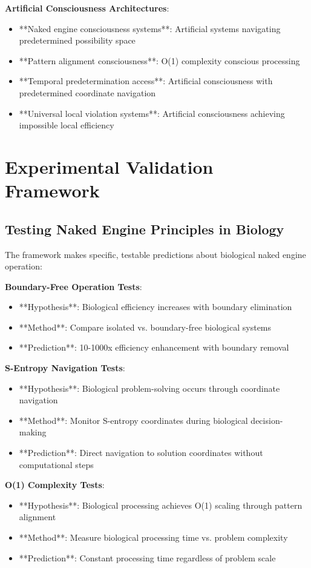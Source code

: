 \documentclass[12pt,a4paper]{article}
\begin{document}
\textbf{Artificial Consciousness Architectures}:
\begin{itemize}
\item **Naked engine consciousness systems**: Artificial systems navigating predetermined possibility space
\item **Pattern alignment consciousness**: O(1) complexity conscious processing
\item **Temporal predetermination access**: Artificial consciousness with predetermined coordinate navigation
\item **Universal local violation systems**: Artificial consciousness achieving impossible local efficiency
\end{itemize}

\section{Experimental Validation Framework}

\subsection{Testing Naked Engine Principles in Biology}

The framework makes specific, testable predictions about biological naked engine operation:

\textbf{Boundary-Free Operation Tests}:
\begin{itemize}
\item **Hypothesis**: Biological efficiency increases with boundary elimination
\item **Method**: Compare isolated vs. boundary-free biological systems
\item **Prediction**: 10-1000x efficiency enhancement with boundary removal
\end{itemize}

\textbf{S-Entropy Navigation Tests}:
\begin{itemize}
\item **Hypothesis**: Biological problem-solving occurs through coordinate navigation
\item **Method**: Monitor S-entropy coordinates during biological decision-making
\item **Prediction**: Direct navigation to solution coordinates without computational steps
\end{itemize}

\textbf{O(1) Complexity Tests}:
\begin{itemize}
\item **Hypothesis**: Biological processing achieves O(1) scaling through pattern alignment
\item **Method**: Measure biological processing time vs. problem complexity
\item **Prediction**: Constant processing time regardless of problem scale
\end{itemize}
\end{document}
